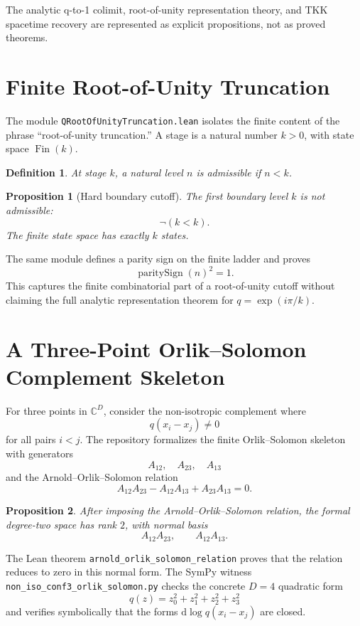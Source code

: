 \documentclass[11pt]{article}
\newtheorem{proposition}{Proposition}
\newtheorem{definition}{Definition}
\newcommand{\C}{\mathbb{C}}
\begin{document}
The analytic q-to-1 colimit, root-of-unity representation theory, and TKK
spacetime recovery are represented as explicit propositions, not as proved
theorems.

\section{Finite Root-of-Unity Truncation}

The module \texttt{QRootOfUnityTruncation.lean} isolates the finite content of
the phrase ``root-of-unity truncation.''  A stage is a natural number \(k>0\),
with state space \(\operatorname{Fin}(k)\).

\begin{definition}
At stage \(k\), a natural level \(n\) is admissible if \(n<k\).
\end{definition}

\begin{proposition}[Hard boundary cutoff]
The first boundary level \(k\) is not admissible:
\[
  \neg(k<k).
\]
The finite state space has exactly \(k\) states.
\end{proposition}

The same module defines a parity sign on the finite ladder and proves
\[
  \operatorname{paritySign}(n)^2=1.
\]
This captures the finite combinatorial part of a root-of-unity cutoff without
claiming the full analytic representation theorem for \(q=\exp(i\pi/k)\).

\section{A Three-Point Orlik--Solomon Complement Skeleton}

For three points in \(\C^D\), consider the non-isotropic complement where
\[
  q(x_i-x_j)\neq 0
\]
for all pairs \(i<j\).  The repository formalizes the finite
Orlik--Solomon skeleton with generators
\[
  A_{12},\quad A_{23},\quad A_{13}
\]
and the Arnold--Orlik--Solomon relation
\[
  A_{12}A_{23}-A_{12}A_{13}+A_{23}A_{13}=0.
\]

\begin{proposition}
After imposing the Arnold--Orlik--Solomon relation, the formal degree-two
space has rank \(2\), with normal basis
\[
  A_{12}A_{23},\qquad A_{12}A_{13}.
\]
\end{proposition}

The Lean theorem \texttt{arnold\_orlik\_solomon\_relation} proves that the
relation reduces to zero in this normal form.  The SymPy witness
\texttt{non\_iso\_conf3\_orlik\_solomon.py} checks the concrete \(D=4\)
quadratic form
\[
  q(z)=z_0^2+z_1^2+z_2^2+z_3^2
\]
and verifies symbolically that the forms \(\mathrm{d}\log q(x_i-x_j)\) are
closed.
\end{document}
